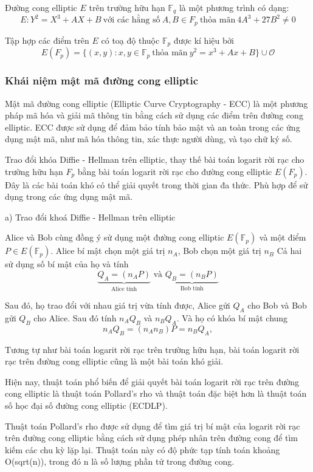 Đường cong elliptic $E$ trên trường hữu hạn $\mathbb{F}_q$ là một phương trình có dạng:
$$E: Y^2 = X^3 + AX + B\ \text{với các hằng số}\ A, B \in F_p\ \text{thỏa mãn}\ 4A^3 + 27B^2 \neq 0$$

Tập hợp các điểm trên $E$ có toạ độ thuộc $\mathbb{F} _p$ được kí hiệu bởi
$$E(F_p) = \{(x, y) : x, y \in \mathbb{F}_p\ \text{thỏa mãn}\ y^2 = x^3 + A x + B\} \cup \mathcal{O}$$

\subsubsection{Khái niệm mật mã đường cong elliptic}
Mật mã đường cong elliptic (Elliptic Curve Cryptography - ECC) 
là một phương pháp mã hóa và giải mã thông tin bằng cách sử dụng các 
điểm trên đường cong elliptic. ECC được sử dụng để đảm bảo tính bảo 
mật và an toàn trong các ứng dụng mật mã, như mã hóa thông tin, xác thực người dùng, và tạo chữ ký số.

Trao đổi khóa Diffie - Hellman trên elliptic, thay thế bài toán logarit rời
rạc cho trường hữu hạn $F_p$ bằng bài toán logarit rời rạc cho đường cong elliptic $E(F_p)$.
Đây là các bài toán khó có thể giải quyết trong thời gian đa thức. Phù 
hợp để sử dụng trong các ứng dụng mật mã.

a) Trao đổi khoá Diffie - Hellman trên elliptic

	Alice và Bob cùng đồng ý sử dụng một đường cong elliptic $E (\mathbb{F}_p)$ và một điểm $P \in E (\mathbb{F}_p)$.
	Alice bí mật chọn một giá trị $n_A$, Bob chọn một giá trị $n_B$
Cả hai sử dụng số bí mật của họ và tính
$$\underbrace{Q_A = (n_AP)}_{\text{Alice tính}} \text{ và } \underbrace{Q_B = (n_BP)}_{\text{Bob tính}}$$

Sau đó, họ trao đổi với nhau giá trị vừa tính được, Alice gửi $Q_A$ cho Bob và Bob gửi
$Q_B$ cho Alice. Sau đó tính $n_A Q_B$ và $ n_BQ_A $.
Và họ có khóa bí mật chung
$$ n_AQ_B = (n_An_B)P = n_BQ_A,$$

Tương tự như bài toán logarit rời rạc trên trường hữu hạn, bài toán logarit rời rạc trên đường cong elliptic 
cũng là một bài toán khó giải. 

Hiện nay, thuật toán phổ biến để giải quyết bài toán logarit rời rạc 
trên đường cong elliptic là thuật toán Pollard's rho và thuật toán 
đặc biệt hơn là thuật toán số học đại số đường cong elliptic (ECDLP).

Thuật toán Pollard's rho được sử dụng để tìm giá trị bí mật của 
logarit rời rạc trên đường cong elliptic bằng cách sử dụng phép 
nhân trên đường cong để tìm kiếm các chu kỳ lặp lại. Thuật toán này 
có độ phức tạp tính toán khoảng O(sqrt(n)), trong đó n là số lượng 
phần tử trong đường cong.

